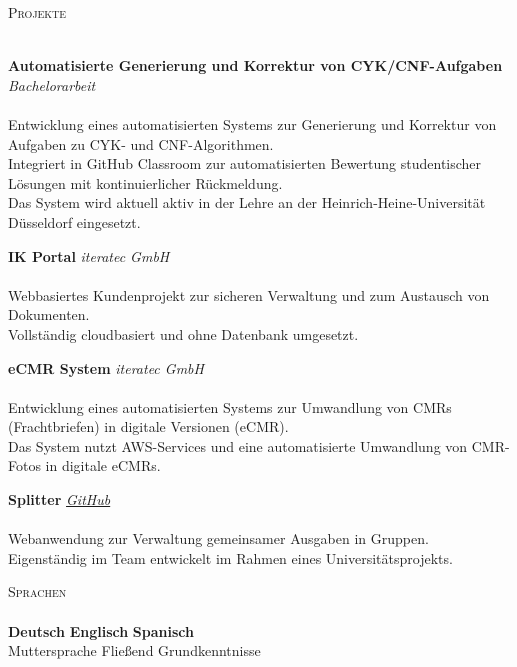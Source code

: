 \documentclass[a4paper]{article}
\newcommand{\lineunder} {
    \vspace*{-8pt} \\
    \hspace*{-18pt} \hrulefill \\
}
\newcommand{\header} [1] {
    {\hspace*{-18pt}\vspace*{6pt} \textsc{#1}}
    \vspace*{-6pt} \lineunder
}
\begin{document}
\vspace{8mm}


\header{Projekte}

\begin{tcolorbox}[myprojectbox]
\textbf{Automatisierte Generierung und Korrektur von CYK/CNF-Aufgaben} \hfill \textit{Bachelorarbeit} \\[4pt]
 \\[4pt]
Entwicklung eines automatisierten Systems zur Generierung und Korrektur von Aufgaben zu CYK- und CNF-Algorithmen.\\
Integriert in GitHub Classroom zur automatisierten Bewertung studentischer Lösungen mit kontinuierlicher Rückmeldung.\\
Das System wird aktuell aktiv in der Lehre an der Heinrich-Heine-Universität Düsseldorf eingesetzt.
\end{tcolorbox}
\vspace{4pt}

\begin{tcolorbox}[myprojectbox]
\textbf{IK Portal} \hfill \textit{iteratec GmbH} \\[4pt]
 \\[4pt]
Webbasiertes Kundenprojekt zur sicheren Verwaltung und zum Austausch von Dokumenten.\\
Vollständig cloudbasiert und ohne Datenbank umgesetzt.
\end{tcolorbox}
\vspace{4pt}

\begin{tcolorbox}[myprojectbox]
\textbf{eCMR System} \hfill \textit{iteratec GmbH} \\[4pt]
 \\[4pt]
Entwicklung eines automatisierten Systems zur Umwandlung von CMRs (Frachtbriefen) in digitale Versionen (eCMR).\\
Das System nutzt AWS-Services und eine automatisierte Umwandlung von CMR-Fotos in digitale eCMRs.
\end{tcolorbox}
\vspace{4pt}


\begin{tcolorbox}[myprojectbox]
\textbf{Splitter} \hfill \textit{\href{https://github.com/BatuhanHerdem/Splitter}{GitHub}} \\[4pt]
 \\[4pt]
Webanwendung zur Verwaltung gemeinsamer Ausgaben in Gruppen.\\
Eigenständig im Team entwickelt im Rahmen eines Universitätsprojekts.
\end{tcolorbox}
\vspace{10pt}



\header{Sprachen}
\textbf{Deutsch} \hspace{18mm} \textbf{Englisch} \hspace{18mm} \textbf{Spanisch}\hspace{18mm}\\
Muttersprache \hspace{10.15mm} Fließend \hspace{19mm} Grundkenntnisse\\
\end{document}
